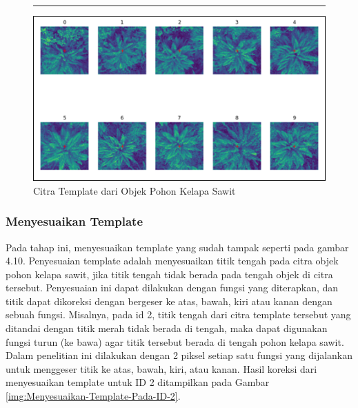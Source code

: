 \begin{figure}[H]
	\vspace{-0.1cm}
	\rule{\columnwidth}{0.1pt}
	\begin{center}
		\includegraphics[width=1\columnwidth]{bab4/Gambar/Picture13.png}
	\end{center}
	\vspace{-0.2cm}
	\captionsetup{justification=centering}
	\caption{Citra Template dari Objek Pohon Kelapa Sawit}\label{img:Citra-Template-Dari-Objek-Dari-Pohon-Kelapa-Sawit}
\end{figure}

\subsubsection{Menyesuaikan Template}
\hspace{1,2cm}
Pada tahap ini, menyesuaikan template yang sudah tampak seperti pada gambar 4.10. Penyesuaian template adalah menyesuaikan titik tengah pada citra objek pohon kelapa sawit, jika titik tengah tidak berada pada tengah objek di citra tersebut. Penyesuaian ini dapat dilakukan dengan fungsi yang diterapkan, dan titik dapat dikoreksi dengan bergeser ke atas, bawah, kiri atau kanan dengan sebuah fungsi. Misalnya, pada id 2, titik tengah dari citra template tersebut yang ditandai dengan titik merah tidak berada di tengah, maka dapat digunakan fungsi turun (ke bawa) agar titik tersebut berada di tengah pohon kelapa sawit. Dalam penelitian ini dilakukan dengan 2 piksel setiap satu fungsi yang dijalankan untuk menggeser titik ke atas, bawah, kiri, atau kanan. Hasil koreksi dari menyesuaikan template untuk ID 2 ditampilkan pada Gambar \ref{img:Menyesuaikan-Template-Pada-ID-2}.

